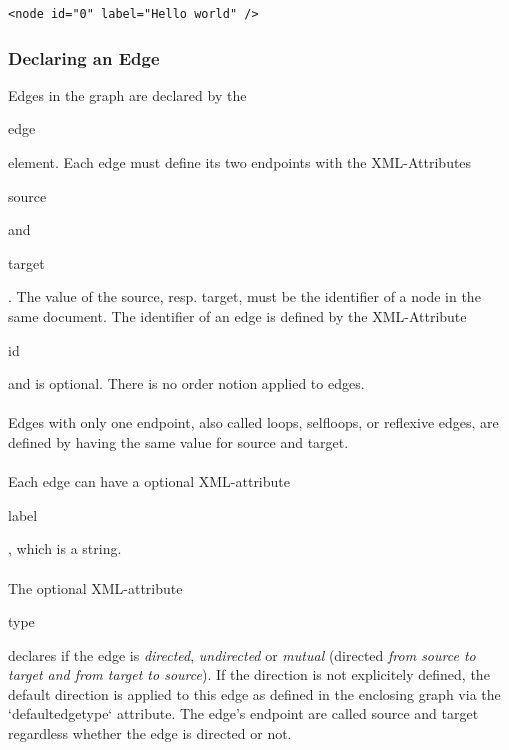 \documentclass[a4paper,10pt]{article}
\begin{document}
\lstset{ style=gexf }
\begin{lstlisting}[caption={A node!},label=aNode]
<node id="0" label="Hello world" />
\end{lstlisting}

\subsubsection{Declaring an Edge}

Edges in the graph are declared by the \begin{footnotesize}edge\end{footnotesize} element. Each edge must define its two endpoints with the XML-Attributes \begin{footnotesize}source\end{footnotesize} and \begin{footnotesize}target\end{footnotesize}. The value of the source, resp. target, must be the identifier of a node in the same document. The identifier of an edge is defined by the XML-Attribute \begin{footnotesize}id\end{footnotesize} and is optional. There is no order notion applied to edges.

\paragraph{}
Edges with only one endpoint, also called loops, selfloops, or reflexive edges, are defined by having the same value for source and target.

\paragraph{}
Each edge can have a optional XML-attribute \begin{footnotesize}label\end{footnotesize}, which is a string.

\paragraph{}
The optional XML-attribute \begin{footnotesize}type\end{footnotesize} declares if the edge is \textit{directed}, \textit{undirected} or \textit{mutual} (directed \textit{from source to target and from target to source}). If the direction is not explicitely defined, the default direction is applied to this edge as defined in the enclosing graph via the `defaultedgetype` attribute. The edge's endpoint are called source and target regardless whether the edge is directed or not.
\end{document}
